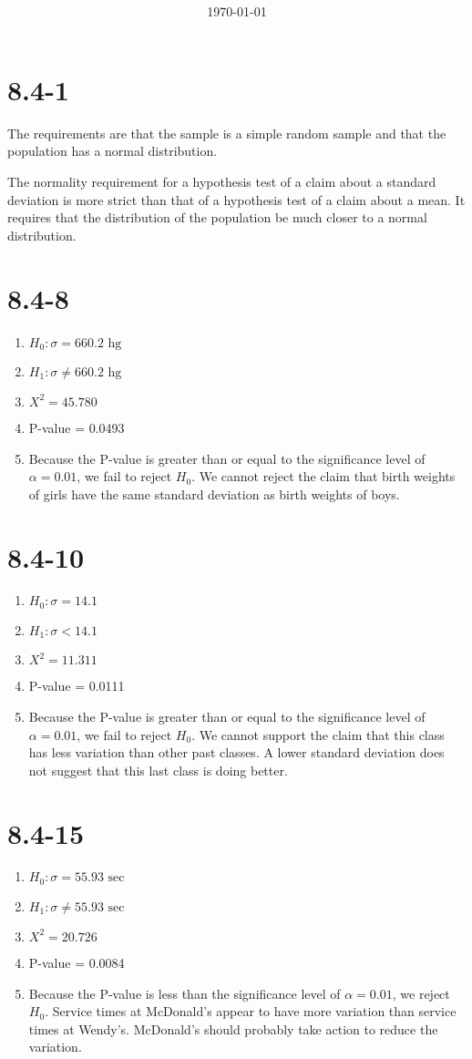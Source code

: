 \message{ !name(Book_Assignment_08.4.tex)}\documentclass[12pt,fleqn]{article}
\title{\classdescription\ \\ \classname\ \\ $\ $ \\ \assignment}
\author{\authorname}
\date{\today}
\newcommand{\chapter}{8.4}
\newcommand{\problem}[1]{\vspace{5ex}\section*{\chapter-#1}}
\begin{document}


\maketitle


\problem{1}
The requirements are that the sample is a simple random sample and that the population has a normal distribution.

The normality requirement for a hypothesis test of a claim about a standard deviation is more strict than that of a hypothesis test of a claim about a mean. It requires that the distribution of the population be much closer to a normal distribution.


\problem{8}
\begin{enumerate}[label=\alph*.]
  \item $H_0: \sigma = 660.2 \text{~hg}$
  \item $H_1: \sigma \ne 660.2 \text{~hg}$
  \item $X^2 = 45.780$
  \item P-value = 0.0493
  \item Because the P-value is greater than or equal to the significance level of $\alpha = 0.01$, we fail to reject $H_0$. We cannot reject the claim that birth weights of girls have the same standard deviation as birth weights of boys.
\end{enumerate}


\problem{10}
\begin{enumerate}[label=\alph*.]
  \item $H_0: \sigma = 14.1$
  \item $H_1: \sigma < 14.1$
  \item $X^2 = 11.311$
  \item P-value = 0.0111
  \item Because the P-value is greater than or equal to the significance level of $\alpha = 0.01$, we fail to reject $H_0$. We cannot support the claim that this class has less variation than other past classes. A lower standard deviation does not suggest that this last class is doing better.
\end{enumerate}


\problem{15}
\begin{enumerate}[label=\alph*.]
  \item $H_0: \sigma = 55.93 \text{~sec}$
  \item $H_1: \sigma \ne 55.93 \text{~sec}$
  \item $X^2 = 20.726$
  \item P-value = 0.0084
  \item Because the P-value is less than the significance level of $\alpha = 0.01$, we reject $H_0$. Service times at McDonald's appear to have more variation than service times at Wendy's. McDonald's should probably take action to reduce the variation.
\end{enumerate}
\end{document}
